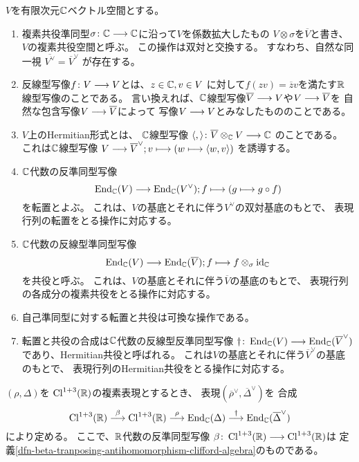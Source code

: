\begin{dfn}
  $V$を有限次元$\mathbb{C}$ベクトル空間とする。
  \begin{enumerate}
    \item
    複素共役準同型$\sigma\colon\mathbb{C}\longrightarrow\mathbb{C}$に沿って$V$を係数拡大したもの
    $V\otimes\sigma$を$\overline{V}$と書き、
    $V$の複素共役空間と呼ぶ。
    この操作は双対と交換する。
    すなわち、自然な同一視 $\overline{V^{\vee}}=\overline{V}^{\vee}$ が存在する。
    \item
    反線型写像$f \colon V\longrightarrow V$とは、$z \in \mathbb{C}, v \in V$
    に対して$f(zv)=\overline{z}v$を満たす$\mathbb{R}$線型写像のことである。
    言い換えれば、$\mathbb{C}$線型写像$\overline{V}\longrightarrow V$や$V\longrightarrow\overline{V}$を
    自然な包含写像$V\longrightarrow\overline{V}$によって
    写像$V\longrightarrow V$とみなしたもののことである。
    \item
    $V$上のHermitian形式とは、
    $\mathbb{C}$線型写像
    $\langle,\rangle\colon\overline{V}\otimes_{\mathbb{C}}V\longrightarrow\mathbb{C}$
    のことである。
    これは$\mathbb{C}$線型写像
    $V\longrightarrow\overline{V}^\vee; v \longmapsto (w \longmapsto \langle w, v\rangle)$ を誘導する。
    \item
    $\mathbb{C}$代数の反準同型写像
    \begin{equation}
      \operatorname{End}_{\mathbb{C}}(V)\longrightarrow\operatorname{End}_{\mathbb{C}}(V^{\vee});
      f \longmapsto (g \longmapsto g \circ f )
    \end{equation}
    を転置とよぶ。
    これは、$V$の基底とそれに伴う$V^{\vee}$の双対基底のもとで、
    表現行列の転置をとる操作に対応する。
    \item
    $\mathbb{C}$代数の反線型準同型写像
    \begin{equation}
      \operatorname{End}_{\mathbb{C}}(V)\longrightarrow\operatorname{End}_{\mathbb{C}}(\overline{V});
      f \longmapsto f \otimes_\sigma \mathrm{id}_{\mathbb{C}}
    \end{equation}
    を共役と呼ぶ。
    これは、$V$の基底とそれに伴う$\overline{V}$の基底のもとで、
    表現行列の各成分の複素共役をとる操作に対応する。
    \item
    自己準同型に対する転置と共役は可換な操作である。
    \item
    転置と共役の合成は$\mathbb{C}$代数の反線型反準同型写像
    $\dagger\colon\operatorname{End}_{\mathbb{C}}(V)\longrightarrow\operatorname{End}_{\mathbb{C}}(\overline{V}^{\vee})$
    であり、Hermitian共役と呼ばれる。
    これは$V$の基底とそれに伴う$\overline{V}^\vee$の基底のもとで、
    表現行列のHermitian共役をとる操作に対応する。
  \end{enumerate}
\end{dfn}

\begin{dfn}
  $(\rho, \Delta)$を
  $\operatorname{Cl}^{1+3}(\mathbb{R})$の複素表現とするとき、
  表現$(\overline{\rho}^\vee,\overline{\Delta}^\vee)$を
  合成
  \begin{equation}
    \operatorname{Cl}^{1+3}(\mathbb{R})\stackrel{\beta}{\longrightarrow}\operatorname{Cl}^{1+3}(\mathbb{R})
    \stackrel{\rho}{\longrightarrow}
    \operatorname{End}_{\mathbb{C}}(\Delta)\stackrel{\dagger}{\longrightarrow}\operatorname{End}_{\mathbb{C}}(\overline{\Delta}^\vee)
  \end{equation}
  により定める。
  ここで、$\mathbb{R}$代数の反準同型写像
  $\beta\colon\operatorname{Cl}^{1+3}(\mathbb{R})\longrightarrow\operatorname{Cl}^{1+3}(\mathbb{R})$は
  定義\ref{dfn-beta-tranposing-antihomomorphism-clifford-algebra}のものである。
\end{dfn}

